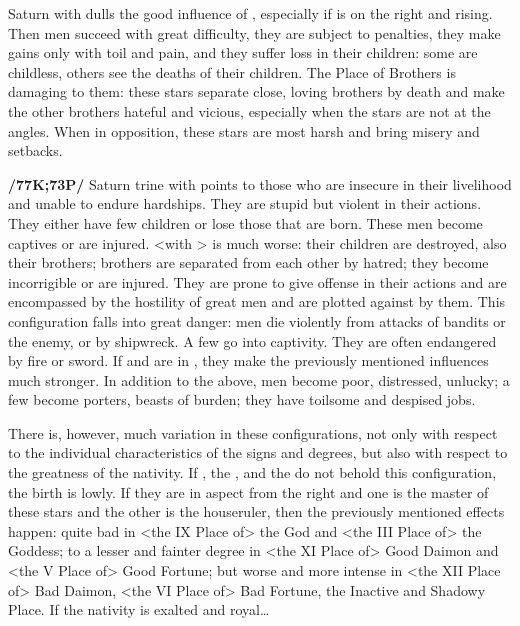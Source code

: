 Saturn \Square\xspace with \Jupiter\xspace dulls the good influence of \Jupiter, especially if \Saturn\xspace is on the right and rising. Then men succeed with great difficulty, they are subject to penalties, they make gains only with
toil and pain, and they suffer loss in their children: some are childless, others see the deaths of their children. The Place of Brothers is damaging to them: these stars separate close, loving brothers by death and make the other brothers hateful and vicious, especially when the stars are not at the angles. When in opposition, these stars are most harsh and bring misery and setbacks.

\textbf{/77K;73P/} Saturn \marginnote{\Saturn \Trine \Mars} trine with \Mars\xspace points to those who are insecure in their livelihood and unable to endure hardships. They are stupid but violent in their actions. They either have few children or lose those that are born. These men become captives or are injured. \Saturn\xspace \Square\xspace <with \Mars> is much worse: their children are destroyed, also their brothers; brothers are separated from each other by hatred; they become incorrigible or are injured. They are prone to give offense in their actions and are encompassed by the hostility of great men and are plotted against by them. This configuration falls into great danger: men die violently from attacks of bandits or the enemy, or by shipwreck. A few go into captivity. They are often endangered by fire or sword. If \Saturn\xspace and \Mars\xspace are in \Opposition, they make the previously mentioned influences much stronger. In addition to the above, men become poor, distressed, unlucky; a few become porters, beasts of burden; they have toilsome and despised jobs. 

There \mndl is, however, much variation in these configurations, not only with respect to the individual characteristics of the signs and degrees, but also with respect to the greatness of the nativity. If \Jupiter, the
\Moon, and the \Sun\xspace do not behold this configuration, the birth is lowly. If they are in aspect from the right
and one is the master of these stars and the other is the houseruler, then the previously mentioned effects happen: quite bad in <the IX Place of> the God and <the III Place of> the Goddess; to a lesser and fainter degree in <the XI Place of> Good Daimon and <the V Place of> Good Fortune; but worse and more intense in <the XII Place of> Bad Daimon, <the VI Place of> Bad Fortune, the Inactive and Shadowy Place. If the nativity is exalted and royal\ldots

